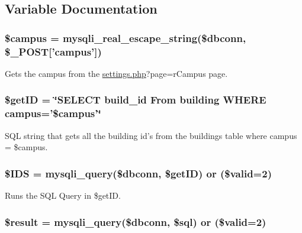 \subsection{\-Variable \-Documentation}
\hypertarget{rmCampus_8php_a6f0655994f3941d6ab50f681032f899b}{
\subsubsection[{\$campus}]{\setlength{\rightskip}{0pt plus 5cm}\$campus = mysqli\-\_\-real\-\_\-escape\-\_\-string(\$dbconn, \$\-\_\-\-P\-O\-S\-T\mbox{[}'campus'\mbox{]})}}\label{rmCampus_8php_a6f0655994f3941d6ab50f681032f899b}
\-Gets the campus from the \hyperlink{settings_8php}{settings.\-php}?page=r\-Campus page. \hypertarget{rmCampus_8php_aae30003a4d3fab7dc75a19cbfddea7a8}{
\subsubsection[{\$get\-I\-D}]{\setlength{\rightskip}{0pt plus 5cm}\$get\-I\-D = \char`\"{}\-S\-E\-L\-E\-C\-T build\-\_\-id \-From building \-W\-H\-E\-R\-E campus='\$campus'\char`\"{}}}\label{rmCampus_8php_aae30003a4d3fab7dc75a19cbfddea7a8}
\-S\-Q\-L string that gets all the building id's from the buildings table where campus = \$campus. \hypertarget{rmCampus_8php_a046621a0674ef3c7f611b85c330fe1c5}{
\subsubsection[{\$\-I\-D\-S}]{\setlength{\rightskip}{0pt plus 5cm}\$\-I\-D\-S = mysqli\-\_\-query(\$dbconn, \$get\-I\-D) or (\$valid=2)}}\label{rmCampus_8php_a046621a0674ef3c7f611b85c330fe1c5}
\-Runs the \-S\-Q\-L \-Query in \$get\-I\-D. \hypertarget{rmCampus_8php_a112ef069ddc0454086e3d1e6d8d55d07}{
\subsubsection[{\$result}]{\setlength{\rightskip}{0pt plus 5cm}\$result = mysqli\-\_\-query(\$dbconn, \$sql) or (\$valid=2)}}\label{rmCampus_8php_a112ef069ddc0454086e3d1e6d8d55d07}

